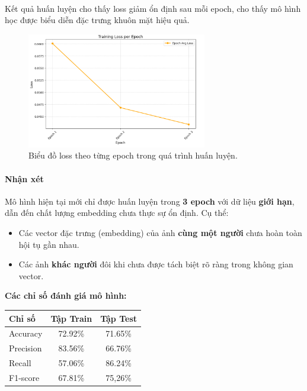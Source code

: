 {\paragraph{}{Kết quả huấn luyện cho thấy loss giảm ổn định sau mỗi epoch, cho thấy mô hình học được biểu diễn đặc trưng khuôn mặt hiệu quả.}
\begin{figure}[H]
    \centering
    \includegraphics[width=0.7\textwidth]{img/05-loss.png} %
    \caption{Biểu đồ loss theo từng epoch trong quá trình huấn luyện.}
    \label{fig:loss}
\end{figure}

\paragraph{Nhận xét}

Mô hình hiện tại mới chỉ được huấn luyện trong \textbf{3 epoch} với dữ liệu \textbf{giới hạn}, dẫn đến chất lượng embedding chưa thực sự ổn định. Cụ thể:

\begin{itemize}
    \item Các vector đặc trưng (embedding) của ảnh \textbf{cùng một người} chưa hoàn toàn hội tụ gần nhau.
    \item Các ảnh \textbf{khác người} đôi khi chưa được tách biệt rõ ràng trong không gian vector.
\end{itemize}

\vspace{0.5em}
\noindent
\textbf{Các chỉ số đánh giá mô hình:}

\begin{table}[H]
    \centering
    \renewcommand{\arraystretch}{1.3}
    \begin{tabular}{|l|c|c|}
        \hline
        \textbf{Chỉ số} & \textbf{Tập Train} & \textbf{Tập Test} \\
        \hline
        Accuracy        & 72.92\%                 & 71.65\%            \\
        Precision       & 83.56\%                 & 66.76\%            \\
        Recall          &57.06\%              & 86.24\%            \\
        F1-score        & 67.81\%               & 75,26\%            \\
        \hline
    \end{tabular}
\end{table}

}
